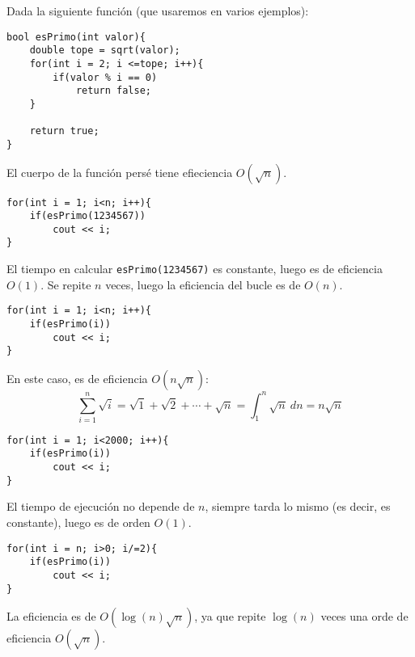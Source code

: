 Dada la siguiente función (que usaremos en varios ejemplos):
\begin{listing}[H]
\begin{verbatim}
bool esPrimo(int valor){
    double tope = sqrt(valor);
    for(int i = 2; i <=tope; i++){
        if(valor % i == 0)
            return false;
    }
    
    return true;
}
\end{verbatim}
\end{listing}
El cuerpo de la función persé tiene efieciencia $O(\sqrt{n})$.

\begin{ejemplo}
\begin{listing}[H]
\begin{verbatim}
for(int i = 1; i<n; i++){
    if(esPrimo(1234567))
        cout << i;
}
\end{verbatim}
\end{listing}
El tiempo en calcular \verb|esPrimo(1234567)| es constante, luego es de eficiencia $O(1)$. Se repite $n$ veces, luego la eficiencia del bucle es de $O(n)$.
\end{ejemplo}

\begin{ejemplo}
\begin{listing}[H]
\begin{verbatim}
for(int i = 1; i<n; i++){
    if(esPrimo(i))
        cout << i;
}
\end{verbatim}
\end{listing}
En este caso, es de eficiencia $O(n\sqrt{n})$:  
\begin{equation*}
\sum_{i=1}^n \sqrt{i} = \sqrt{1} + \sqrt{2} + \cdots + \sqrt{n} = \int_{1}^n \sqrt{n}\ dn = n\sqrt{n}
\end{equation*}
\end{ejemplo}

\begin{ejemplo}
\begin{listing}[H]
\begin{verbatim}
for(int i = 1; i<2000; i++){
    if(esPrimo(i))
        cout << i;
}
\end{verbatim}
\end{listing}
El tiempo de ejecución no depende de $n$, siempre tarda lo mismo (es decir, es constante), luego es de orden $O(1)$.
\end{ejemplo}

\begin{ejemplo}
\begin{listing}[H]
\begin{verbatim}
for(int i = n; i>0; i/=2){
    if(esPrimo(i))
        cout << i;
}
\end{verbatim}
\end{listing}
La eficiencia es de $O(\log(n)\sqrt{n})$, ya que repite $\log(n)$ veces una orde de eficiencia $O(\sqrt{n})$.
\end{ejemplo}

